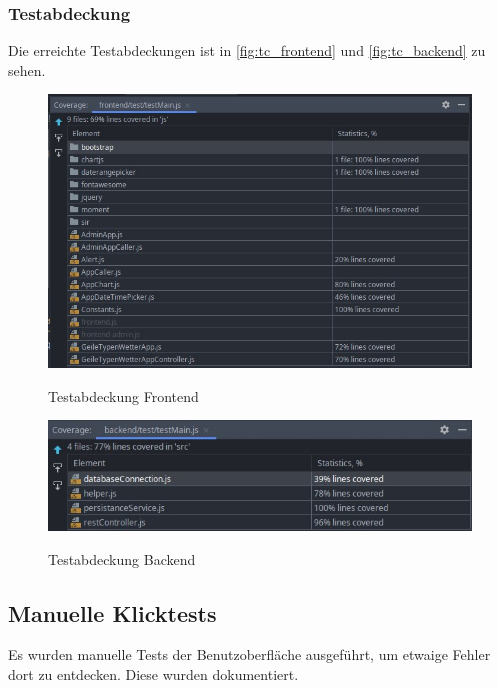\subsubsection{Testabdeckung}
Die erreichte Testabdeckungen ist in \autoref{fig:tc_frontend} und \autoref{fig:tc_backend} zu sehen.
\begin{figure}[H]
    \centering
    \begin{minipage}[t]{1\textwidth}
        \caption{Testabdeckung Frontend}
        \includegraphics[width=1\textwidth]{img/tc_frontend2.png}\\
        \label{fig:tc_frontend}
    \end{minipage}
\end{figure}
\begin{figure}[H]
    \centering
    \begin{minipage}[t]{1\textwidth}
        \caption{Testabdeckung Backend}
        \includegraphics[width=1\textwidth]{img/tc_backend2.png}\\
        \label{fig:tc_backend}
    \end{minipage}
\end{figure}
\subsection{Manuelle Klicktests}
Es wurden manuelle Tests der Benutzoberfläche ausgeführt, um etwaige Fehler dort zu entdecken.
Diese wurden dokumentiert.
